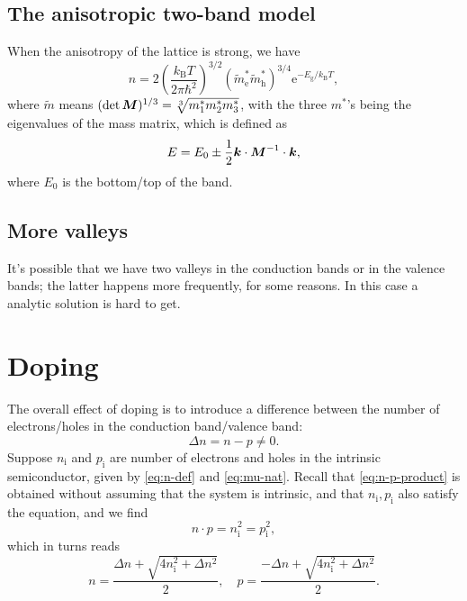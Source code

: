 \documentclass[hyperref, a4paper]{article}
\newcommand*{\ee}{\mathrm{e}}
\begin{document}
\subsection{The anisotropic two-band model}

When the anisotropy of the lattice is strong, we have 
\begin{equation}
    n = 2 \left( \frac{k_{\text{B}} T}{2 \pi \hbar^2} \right)^{3/2} (\tilde{m}_{\text{e}}^* \tilde{m}_{\text{h}}^*)^{3/4} \ee^{- E_{\text{g}} / k_{\text{B}} T},
\end{equation}
where $\tilde{m}$ means $(\det \vb*{M})^{1/3} = \sqrt[3]{m_1^* m_2^* m_3^*}$,
with the three $m^*$'s being the eigenvalues of the mass matrix,
which is defined as 
\begin{equation}
    E = E_0 \pm \frac{1}{2} \vb*{k} \cdot \vb*{M}^{-1} \cdot \vb*{k},
\end{equation}
where $E_0$ is the bottom/top of the band.

\subsection{More valleys}

It's possible that we have two valleys in the conduction bands
or in the valence bands; 
the latter happens more frequently, for some reasons.
In this case a analytic solution is hard to get.

\section{Doping}

The overall effect of doping is to introduce a difference 
between the number of electrons/holes in the conduction band/valence band:
\begin{equation}
    \Delta n = n - p \neq 0.
\end{equation}
Suppose $n_{\text{i}}$ and $p_{\text{i}}$ are number of electrons and holes 
in the intrinsic semiconductor, 
given by \eqref{eq:n-def} and \eqref{eq:mu-nat}.
Recall that \eqref{eq:n-p-product} is obtained 
without assuming that the system is intrinsic,
and that $n_{\text{i}}, p_{\text{i}}$ also satisfy the equation,
and we find 
\begin{equation}
    n \cdot p = n_{\text{i}}^2 = p_{\text{i}}^2,
\end{equation}
which in turns reads  
\begin{equation}
    n = \frac{\Delta n + \sqrt{4 n_{\text{i}}^2 + \Delta n^2}}{2}, \quad 
    p = \frac{-\Delta n + \sqrt{4 n_{\text{i}}^2 + \Delta n^2}}{2}.
\end{equation}
\end{document}
